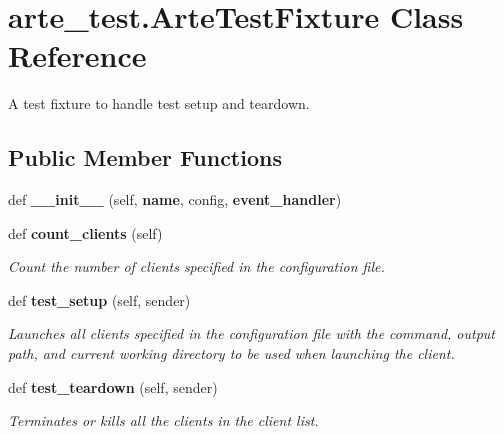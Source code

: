 \section{arte\+\_\+test.\+Arte\+Test\+Fixture Class Reference}
\label{classarte__test_1_1_arte_test_fixture}


A test fixture to handle test setup and teardown.  


\subsection*{Public Member Functions}
\begin{DoxyCompactItemize}
\item 
def {\bfseries \+\_\+\+\_\+init\+\_\+\+\_\+} (self, {\bf name}, config, {\bf event\+\_\+handler})\label{classarte__test_1_1_arte_test_fixture_a619a89b940d44328e2625532f29275f9}

\item 
def {\bf count\+\_\+clients} (self)
\begin{DoxyCompactList}\small\item\em Count the number of clients specified in the configuration file. \end{DoxyCompactList}\item 
def {\bf test\+\_\+setup} (self, sender)
\begin{DoxyCompactList}\small\item\em Launches all clients specified in the configuration file with the command, output path, and current working directory to be used when launching the client. \end{DoxyCompactList}\item 
def {\bf test\+\_\+teardown} (self, sender)
\begin{DoxyCompactList}\small\item\em Terminates or kills all the clients in the client list. \end{DoxyCompactList}\end{DoxyCompactItemize}
